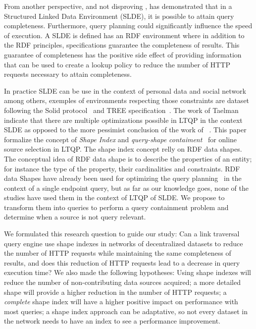 From another perspective, and not disproving \citeauthor{hartig2016walking}, \citeauthor{Taelman2023} has demonstrated that in a Structured Linked Data Environment (SLDE),
it is possible to attain query completeness.
Furthermore, query planning could significantly influence the speed of execution.
A SLDE is defined has an RDF environment where in addition to the RDF principles, specifications
guarantee the completeness of results.
This guarantee of completeness has the positive side effect of providing information
that can be used to create a lookup policy to reduce the number of HTTP requests necessary to attain completeness.

In practice SLDE can be use in the context of personal data and social network among others,
exemples of environments respecting those constraints are dataset following the Solid protocol~\cite{Taelman2023} and TREE specification~\cite{tam_iswc_traversalsensortree_2024}.
The work of Taelman~\cite{Taelman2023} indicate that there are multiple optimizations possible in LTQP in the context SLDE as opposed to the
more pessimist conclusion of the work of ~\citeauthor{hartig2016walking}.
This paper formalize the concept of \emph{Shape Index} and \emph{query-shape contaiment}~\cite{tam2024opportunitiesshapebasedoptimizationlink} for online source selection in LTQP.
The shape index concept relly on RDF data shapes.
The conceptual idea of RDF data shape is to describe the properties of an entity;
for instance the type of the property, their cardinalities and constraints.
RDF data Shapes have already been used for optimizing the query planning~\cite{kashif2021}
in the context of a single endpoint query, but as far as our knowledge goes, none of the studies have used them in the context of LTQP of SLDE.
We propose to transform them into queries to perform a query containment problem and determine when a source is not query relevant.

We formulated this research question to guide our study:
Can a link traversal query engine use shape indexes in networks of decentralized datasets to reduce the number of HTTP requests while maintaining the same completeness of results, and does this reduction of HTTP requests lead to a decrease in query execution time?
We also made the following hypotheses:
Using shape indexes will reduce the number of non-contributing data sources acquired;
a more detailed shape will provide a higher reduction in the number of HTTP requests;
a \emph{complete} shape index will have a higher positive impact on performance with most queries;
a shape index approach can be adaptative, so not every dataset in the network needs to have an index to see a performance improvement.
\iffalse
Can our method reduce the ratio of non-contributing data source dereferenced?
How does the diminution of HTTP request affect the query execution time?
How does the level of detail of the shapes impact the performances?
What is the difference in performance between a \emph{complete} and an \emph{incomplete} shape index?
How does the ratio of subdomains containing an index influence global performances?
How does the fragmentation of the subdomain impact the performance?
How does the quantity of non-query contributing resources impact the performances?
What is the ideal query execution time if we only dereferenced contributing data sources?
\fi